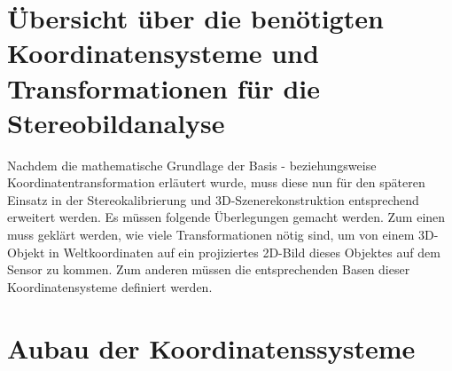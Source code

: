 	
\section{Übersicht über die benötigten Koordinatensysteme und Transformationen für die Stereobildanalyse}
	
Nachdem die mathematische Grundlage der Basis - beziehungsweise Koordinatentransformation erläutert wurde, muss diese nun für den späteren Einsatz in der Stereokalibrierung und 3D-Szenerekonstruktion entsprechend erweitert werden. Es müssen folgende Überlegungen gemacht werden. Zum einen muss geklärt werden, wie viele Transformationen nötig sind, um von einem 3D-Objekt in Weltkoordinaten auf ein projiziertes 2D-Bild dieses Objektes auf dem Sensor zu kommen. Zum anderen müssen die entsprechenden Basen dieser Koordinatensysteme definiert werden.

\section{Aubau der Koordinatenssysteme}
		
